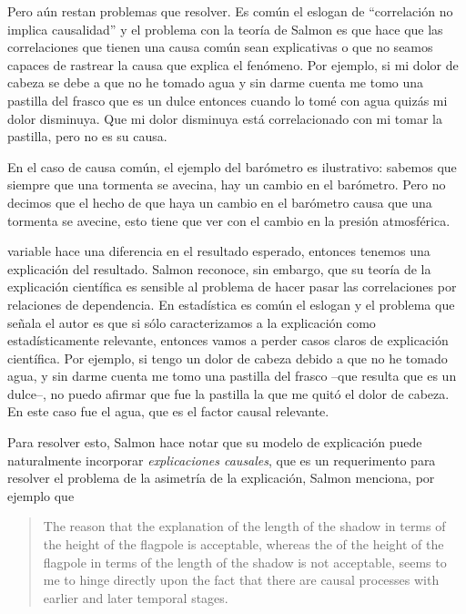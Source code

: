Pero aún restan problemas que resolver. Es común el eslogan de ``correlación no implica causalidad'' y el problema con la teoría de Salmon es que hace que las correlaciones que tienen una causa común sean explicativas o que no seamos capaces de rastrear la causa que explica el fenómeno. Por ejemplo, si mi dolor de cabeza se debe a que no he tomado agua y sin darme cuenta me tomo una pastilla del frasco que es un dulce entonces cuando lo tomé con agua quizás mi dolor disminuya. Que mi dolor disminuya está correlacionado con mi tomar la pastilla, pero no es su causa.

En el caso de causa común, el ejemplo del barómetro es ilustrativo: sabemos que siempre que una tormenta se avecina, hay un cambio en el barómetro. Pero no decimos que el hecho de que haya un cambio en el barómetro causa que una tormenta se avecine, esto tiene que ver con el cambio en la presión atmosférica.


variable hace una diferencia en el resultado esperado, entonces
tenemos una explicación del resultado. Salmon reconoce, sin embargo,
que su teoría de la explicación científica es sensible al problema
de hacer pasar las correlaciones por relaciones de dependencia. En
estadística es común el eslogan  y el problema que señala el autor es que si sólo
caracterizamos a la explicación como estadísticamente relevante,
entonces vamos a perder casos claros de explicación científica. Por
ejemplo, si tengo un dolor de cabeza debido a que no he tomado agua,
y sin darme cuenta me tomo una pastilla del frasco --que resulta que
es un dulce--, no puedo afirmar que fue la pastilla la que me quitó
el dolor de cabeza. En este caso fue el agua, que es el factor
causal relevante.

Para resolver esto, Salmon hace notar que su modelo de explicación
puede naturalmente incorporar \emph{explicaciones causales}, que es
un requerimento para resolver el problema de la asimetría de la
explicación, Salmon menciona, por ejemplo que

\begin{quote}
	The reason that the explanation of the length of the shadow in
	terms of the height of the flagpole is acceptable, whereas the
	 of the height of the flagpole in terms of the
	length of the shadow is not acceptable, seems to me to hinge
	directly upon the fact that there are causal processes with
	earlier and later temporal stages.
\end{quote}

